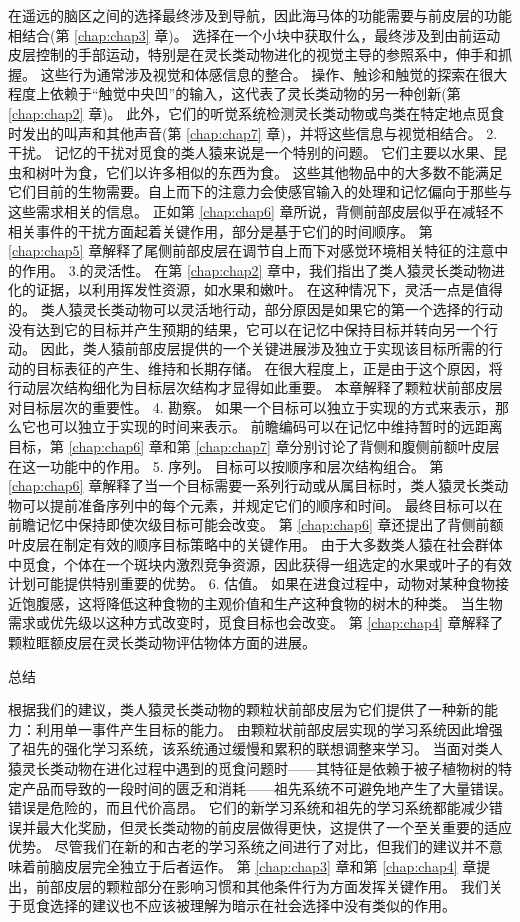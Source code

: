 在遥远的脑区之间的选择最终涉及到导航，因此海马体的功能需要与前皮层的功能相结合(第 \ref{chap:chap3} 章)。
选择在一个小块中获取什么，最终涉及到由前运动皮层控制的手部运动，特别是在灵长类动物进化的视觉主导的参照系中，伸手和抓握。
这些行为通常涉及视觉和体感信息的整合。
操作、触诊和触觉的探索在很大程度上依赖于“触觉中央凹”的输入，这代表了灵长类动物的另一种创新(第 \ref{chap:chap2} 章)。
此外，它们的听觉系统检测灵长类动物或鸟类在特定地点觅食时发出的叫声和其他声音(第 \ref{chap:chap7} 章)，并将这些信息与视觉相结合。
2. 干扰。
记忆的干扰对觅食的类人猿来说是一个特别的问题。
它们主要以水果、昆虫和树叶为食，它们以许多相似的东西为食。
这些其他物品中的大多数不能满足它们目前的生物需要。自上而下的注意力会使感官输入的处理和记忆偏向于那些与这些需求相关的信息。
正如第 \ref{chap:chap6} 章所说，背侧前部皮层似乎在减轻不相关事件的干扰方面起着关键作用，部分是基于它们的时间顺序。
第 \ref{chap:chap5} 章解释了尾侧前部皮层在调节自上而下对感觉环境相关特征的注意中的作用。
3.的灵活性。
在第 \ref{chap:chap2} 章中，我们指出了类人猿灵长类动物进化的证据，以利用挥发性资源，如水果和嫩叶。
在这种情况下，灵活一点是值得的。
类人猿灵长类动物可以灵活地行动，部分原因是如果它的第一个选择的行动没有达到它的目标并产生预期的结果，它可以在记忆中保持目标并转向另一个行动。
因此，类人猿前部皮层提供的一个关键进展涉及独立于实现该目标所需的行动的目标表征的产生、维持和长期存储。
在很大程度上，正是由于这个原因，将行动层次结构细化为目标层次结构才显得如此重要。
本章解释了颗粒状前部皮层对目标层次的重要性。
4. 勘察。
如果一个目标可以独立于实现的方式来表示，那么它也可以独立于实现的时间来表示。
前瞻编码可以在记忆中维持暂时的远距离目标，第 \ref{chap:chap6} 章和第 \ref{chap:chap7} 章分别讨论了背侧和腹侧前额叶皮层在这一功能中的作用。
5. 序列。
目标可以按顺序和层次结构组合。
第 \ref{chap:chap6} 章解释了当一个目标需要一系列行动或从属目标时，类人猿灵长类动物可以提前准备序列中的每个元素，并规定它们的顺序和时间。
最终目标可以在前瞻记忆中保持即使次级目标可能会改变。
第 \ref{chap:chap6} 章还提出了背侧前额叶皮层在制定有效的顺序目标策略中的关键作用。
由于大多数类人猿在社会群体中觅食，个体在一个斑块内激烈竞争资源，因此获得一组选定的水果或叶子的有效计划可能提供特别重要的优势。
6. 估值。
如果在进食过程中，动物对某种食物接近饱腹感，这将降低这种食物的主观价值和生产这种食物的树木的种类。
当生物需求或优先级以这种方式改变时，觅食目标也会改变。
第 \ref{chap:chap4} 章解释了颗粒眶额皮层在灵长类动物评估物体方面的进展。



总结

根据我们的建议，类人猿灵长类动物的颗粒状前部皮层为它们提供了一种新的能力：利用单一事件产生目标的能力。
由颗粒状前部皮层实现的学习系统因此增强了祖先的强化学习系统，该系统通过缓慢和累积的联想调整来学习。
当面对类人猿灵长类动物在进化过程中遇到的觅食问题时——其特征是依赖于被子植物树的特定产品而导致的一段时间的匮乏和消耗——祖先系统不可避免地产生了大量错误。
错误是危险的，而且代价高昂。
它们的新学习系统和祖先的学习系统都能减少错误并最大化奖励，但灵长类动物的前皮层做得更快，这提供了一个至关重要的适应优势。
尽管我们在新的和古老的学习系统之间进行了对比，但我们的建议并不意味着前脑皮层完全独立于后者运作。
第 \ref{chap:chap3} 章和第 \ref{chap:chap4} 章提出，前部皮层的颗粒部分在影响习惯和其他条件行为方面发挥关键作用。
我们关于觅食选择的建议也不应该被理解为暗示在社会选择中没有类似的作用。



